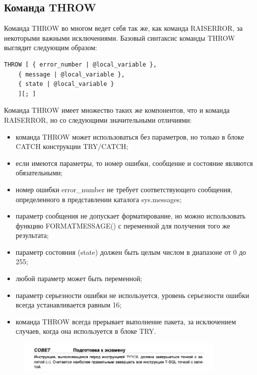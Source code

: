 \subsection{Команда THROW}

Команда THROW во многом ведет себя так же, как команда RAISERROR, за некоторыми
важными исключениями. Базовый синтаксис команды THROW выглядит следующим
образом: 


\begin{lstlisting}[label=lst:funcReturn, language=sql]
	THROW [ { error_number | @local_variable },
	{ message | @local_variable },
	{ state | @local_variable }
	][; ]
\end{lstlisting}

Команда THROW имеет множество таких же компонентов, что и команда RAISERROR,
но со следующими значительными отличиями: 
\begin{itemize}
	\item команда THROW может использоваться без параметров, но только в блоке CATCH
	конструкции TRY/CATCH; 
	\item если имеются параметры, то номер ошибки, сообщение и состояние являются
	обязательными;
	\item номер ошибки error\_number не требует соответствующего сообщения, определенного в представлении каталога sys.messages; 
	\item параметр сообщения не допускает форматирование, но можно использовать
	функцию FORMATMESSAGE() с переменной для получения того же результата; 
	\item параметр состояния (state) должен быть целым числом в диапазоне от 0 до 255; 
	\item любой параметр может быть переменной;
	\item параметр серьезности ошибки не используется, уровень серьезности ошибки
	всегда устанавливается равным 16; 
	\item команда THROW всегда прерывает выполнение пакета, за исключением случаев,
	когда она используется в блоке TRY. 
\end{itemize}


\begin{figure}[h!]
	\begin{center}
		\includegraphics[width=0.9\textwidth]{img/advice30.png}
	\end{center}
	\captionsetup{justification=centering}
\end{figure}

